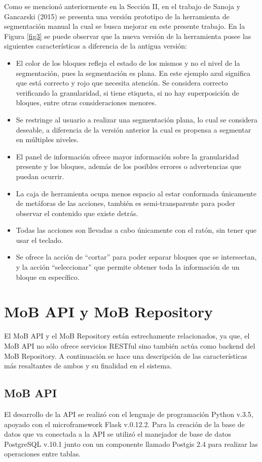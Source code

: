 \documentclass[10pt]{revecom}
\begin{document}
Como se mencionó anteriormente en la Sección II, en el trabajo de  Sanoja y Gancarski (2015) \cite{Sanoja:LIP6:2015,SanGan:SAC:2015} se presenta una versión prototipo de la herramienta de segmentación manual la cual se busca mejorar en este presente trabajo. En la Figura \ref{fig3} se puede observar que la nueva versión de la herramienta posee las siguientes características a diferencia de la antigua versión:
\begin{itemize}
\item El color de los bloques refleja el estado de los mismos y no el nivel de la segmentación, pues la segmentación es plana. En este ejemplo azul significa que está correcto y rojo que necesita atención. Se considera correcto verificando la granularidad, si tiene etiqueta, si no hay superposición de bloques, entre otras consideraciones menores.
\item Se restringe al usuario a realizar una segmentación plana, lo cual se considera deseable, a diferencia de la versión anterior la cual es propensa a segmentar en múltiples niveles.    
\item El panel de información ofrece mayor información sobre la granularidad presente y los bloques, además de los posibles errores o advertencias que puedan ocurrir. 
\item La caja de herramienta ocupa menos espacio al estar conformada únicamente de metáforas de las acciones, también es semi-transparente para poder observar el contenido que existe detrás.
\item Todas las acciones son llevadas a cabo únicamente con el ratón, sin tener que usar el teclado. 
\item Se ofrece la acción de ``cortar'' para poder separar bloques que se intersectan, y la acción ``seleccionar'' que permite obtener toda la información de un bloque en específico.  
\end{itemize}

\section{MoB API y MoB Repository}
\label{api_repo}
El MoB API y el MoB Repository están estrechamente relacionados, ya que, el MoB API no sólo ofrece servicios RESTful sino también actúa como backend del MoB Repository. A continuación se hace una descripción de las características más resaltantes de ambos y su finalidad en el sistema. 

\subsection{MoB API}
El desarrollo de la API se realizó con el lenguaje de programación Python v.3.5, apoyado con el microframework Flask v.0.12.2. Para la creación de la base de datos que va conectada a la API se utilizó el manejador de base de datos PostgreSQL v.10.1 junto con un componente llamado Postgis 2.4 para realizar las operaciones entre tablas.
\end{document}
